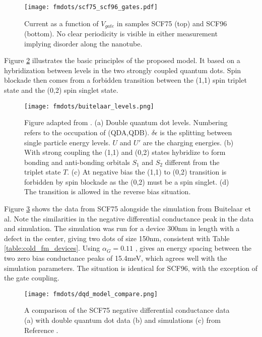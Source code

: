 \begin{figure}
    \centering
    \texttt{[image: fmdots/scf75\_scf96\_gates.pdf]}
    \caption{Current as a function of $V_{gate}$ in samples SCF75 (top) and SCF96 (bottom). No clear periodicity is visible in either measurement implying disorder along the nanotube.}
    \label{fig:scf75_scf96_gates}
\end{figure}

Figure \ref{fig:buitelaar_levels} illustrates the basic principles of the proposed model. It based on a hybridization between levels in the two strongly coupled quantum dots. Spin blockade then comes from a forbidden transition between the (1,1) spin triplet state and the (0,2) spin singlet state.

\begin{figure}
    \centering
    \texttt{[image: fmdots/buitelaar\_levels.png]}
    \caption{Figure adapted from \cite{Buitelaar2008}. (a) Double quantum dot levels. Numbering refers to the occupation of (QDA,QDB). $\delta \epsilon$ is the splitting between single particle energy levels. $U$ and $U'$ are the charging energies. (b) With strong coupling the (1,1) and (0,2) states hybridize to form bonding and anti-bonding orbitals $S_1$ and $S_2$ different from the triplet state $T$. (c) At negative bias the (1,1) to (0,2) transition is forbidden by spin blockade as the (0,2) must be a spin singlet. (d) The transition is allowed in the reverse bias situation.}
    \label{fig:buitelaar_levels}
\end{figure}

Figure \ref{fig:dqd_model_compare} shows the data from SCF75 alongside the simulation from Buitelaar et al. Note the similarities in the negative differential conductance peak in the data and simulation. The simulation was run for a device 300nm in length with a defect in the center, giving two dots of size 150nm, consistent with Table \ref{table:cold_fm_devices}. Using $\alpha_G = 0.11$ , gives an energy spacing between the two zero bias conductance peaks of 15.4meV, which agrees well with the simulation parameters. The situation is identical for SCF96, with the exception of the gate coupling.

\begin{figure}
    \centering
    \texttt{[image: fmdots/dqd\_model\_compare.png]}
    \caption{A comparison of the SCF75 negative differential conductance data (a) with double quantum dot data (b) and simulations (c) from Reference \cite{Buitelaar2008}.}
    \label{fig:dqd_model_compare}
\end{figure}


